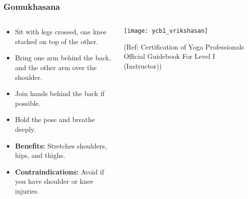 \begin{frame}[fragile]\frametitle{Gomukhasana}
\begin{columns}
    \begin{column}[T]{0.5\linewidth}
      \begin{itemize}
        \item Sit with legs crossed, one knee stacked on top of the other.
        \item Bring one arm behind the back, and the other arm over the shoulder.
        \item Join hands behind the back if possible.
        \item Hold the pose and breathe deeply.
        \item \textbf{Benefits:} Stretches shoulders, hips, and thighs.
        \item \textbf{Contraindications:} Avoid if you have shoulder or knee injuries.
      \end{itemize}
    \end{column}
    \begin{column}[T]{0.5\linewidth}
        \begin{center}
        \begin{center}
		        \texttt{[image: ycb1\_vrikshasan]}
				
				{\tiny (Ref: Certification  of Yoga Professionals Official Guidebook For Level I (Instructor))}	        
		\end{center}   
        \end{center}    
    \end{column}
  \end{columns}
\end{frame}

